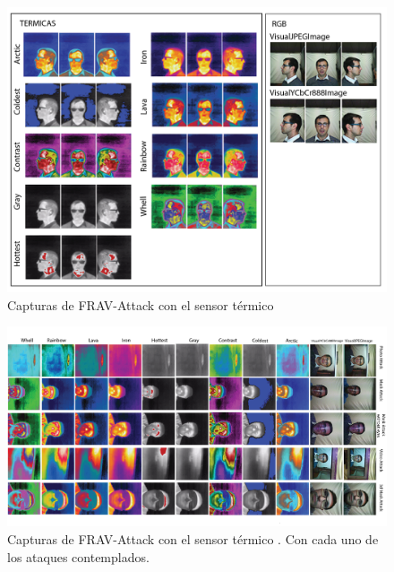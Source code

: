 \begin{landscape}
 \begin{figure}
  \centering
  \includegraphics{ch-sistemasABC/images/ch-BBDDs/DISTINTAS_PALETAS_TERMICAS.png}
        \caption{Capturas de \Gls{FRAV-Attack} con el sensor térmico }
        \label{fig:DISTINTAS_PALETAS_TERMICAS}
 \end{figure}
\end{landscape}

\begin{landscape}
 \begin{figure}
  \centering
  \includegraphics[width=1.5\textwidth]{ch-sistemasABC/images/ch-BBDDs/DISTINTOS_ATAQUES_DISTINTAS_PALETAS.png}
        \caption{Capturas de \Gls{FRAV-Attack} con el sensor térmico . Con cada uno de los ataques contemplados.}
        \label{fig:DISTINTOS_ATAQUES_DISTINTAS_PALETAS}
 \end{figure}
\end{landscape}


